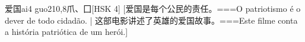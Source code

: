 \begin{EntryWithPhonetic}{爱国}{ai4 guo2}{10,8}{⽖、⼞}[HSK 4]
  [爱国是每个公民的责任。===O patriotismo é o dever de todo cidadão. | 这部电影讲述了英雄的爱国故事。===Este filme conta a história patriótica de um herói.]
\end{EntryWithPhonetic}
